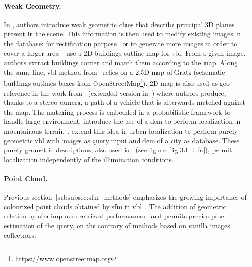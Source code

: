 		\paragraph{Weak Geometry.}
			\label{subsubsec:weak_geometry}			
			In \citep{Torii2015,Chen2011}, authors introduce weak geometric clues that describe principal 3D planes present in the scene. This information is then used to modify existing images in the database: for rectification purpose~\citep{Chen2011} or to generate more images in order to cover a larger area~\citep{Torii2015}. \citet{Cham2010} use a 2D buildings outline map for \ac{vbl}. From a given image, authors extract buildings corner and match them according to the map. Along the same line, \ac{vbl} method from~\citep{Arth2015,Armagan2017a,Armagan2017b,Armagan2017} relies on a 2.5D map of Gratz (schematic buildings outlines boxes from OpenStreetMap\footnote{https://www.openstreetmap.org}). 2D map is also used as geo-reference in the work from~\citep{Brubaker2013} (extended version in~\citep{Brubaker2016}) where authors produce, thanks to a stereo-camera, a path of a vehicle that is afterwards matched against the map. The matching process is embedded in a probabilistic framework to handle large environment. \citet{Baatz2012} introduce the use of a \ac{dem} to perform localization in mountainous terrain~\citep{Ramalingam2010,Tzeng2013,Chen2015}. \citet{Bansal2014} extend this idea in urban localization to perform purely geometric \ac{vbl} with images as query input and \ac{dem} of a city as database. These purely geometric descriptions, also used in~\citep{Matei2013,Christie2016,Ramalingam2010,Ramalingam2011} (see figure~\ref{fig:3d_info}), permit localization independently of the illumination conditions.

		\paragraph{Point Cloud.}
        \label{subsubsec:3d_geometry}
			Previous section~\ref{subsubsec:sfm_methods} emphasizes the growing importance of colourized point clouds obtained by \ac{sfm} in \ac{vbl}~\citep{Irschara2009,Li2010,Sattler2011,Sattler2012,Sattler2015,Middelberg2014,Lynen2015,Lu2015,Svarm2014,Zeisl2015,Svarm2016,Sattler2016a,Feng2016a}. The addition of geometric relation by \ac{sfm} improves retrieval performances~\citep{Sattler2012a} and permits precise pose estimation of the query, on the contrary of methods based on vanilla images collections.
			
